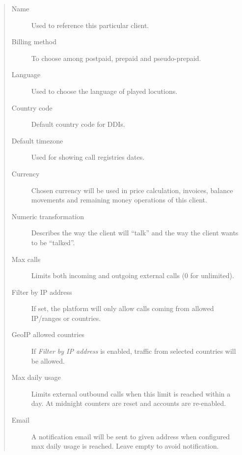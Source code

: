 \documentclass[letterpaper,10pt,spanish]{sphinxmanual}
\begin{document}
\begin{quote}
\begin{description}
\item[{Name}] \leavevmode
Used to reference this particular client.

\item[{Billing method}] \leavevmode
To choose among postpaid, prepaid and pseudo-prepaid.

\item[{Language}] \leavevmode
Used to choose the language of played locutions.

\item[{Country code}] \leavevmode
Default country code for DDIs.

\item[{Default timezone}] \leavevmode
Used for showing call registries dates.

\item[{Currency}] \leavevmode
Chosen currency will be used in price calculation, invoices, balance movements and
remaining money operations of this client.

\item[{Numeric transformation}] \leavevmode
Describes the way the client will ``talk'' and the way the client wants to be ``talked''.

\item[{Max calls}] \leavevmode
Limits both incoming and outgoing external calls (0 for unlimited).

\item[{Filter by IP address}] \leavevmode
If set, the platform will only allow calls coming from allowed IP/ranges or countries.

\item[{GeoIP allowed countries}] \leavevmode
If \emph{Filter by IP address} is enabled, traffic from selected countries will be allowed.

\item[{Max daily usage}] \leavevmode
Limits external outbound calls when this limit is reached within a day. At midnight counters are reset and
accounts are re-enabled.

\item[{Email}] \leavevmode
A notification email will be sent to given address when configured max daily usage is reached. Leave empty to
avoid notification.

\end{description}
\end{quote}
\end{document}
